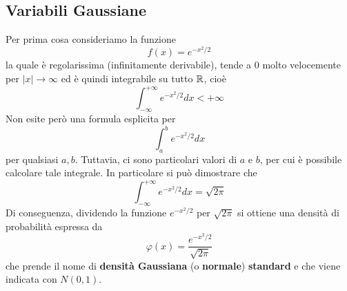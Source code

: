 \subsection{Variabili Gaussiane}
Per prima cosa consideriamo la funzione
\[ f(x) = e^{-x^2 / 2} \]
la quale è regolarissima (infinitamente derivabile), tende a 0 molto velocemente per
$|x| \to \infty$ ed è quindi integrabile su tutto $\mathbb{R}$, cioè
\[ \int_{-\infty}^{+\infty} e^{-x^2/2} dx < +\infty \]
Non esite però una formula esplicita per
\[ \int_a^b e^{-x^2 / 2} dx \]
per qualsiasi $a,b$. Tuttavia, ci sono particolari valori di $a$ e $b$, per cui è possibile
calcolare tale integrale. In particolare si può dimostrare che
\[ \int_{-\infty}^{+\infty} e^{-x^2 / 2} dx = \sqrt{2 \pi} \]
Di conseguenza, dividendo la funzione $e^{-x^2/2}$ per $\sqrt{2 \pi}$ si ottiene una densità di
probabilità espressa da
\[ \varphi (x) = \frac{e^{-x^2 / 2}}{\sqrt{2 \pi}} \]
che prende il nome di \textbf{densità Gaussiana} (o \textbf{normale}) \textbf{standard} e che viene
indicata con $N(0,1)$.

\begin{center}
\end{center}


